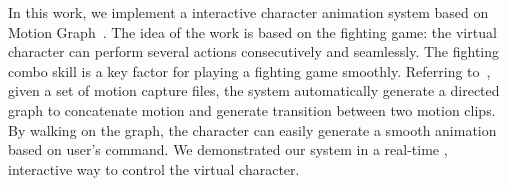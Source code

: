 In this work, we implement a interactive character animation system based on Motion Graph~\cite{kovar2002}.
The idea of the work is based on the fighting game: the virtual character can perform several actions 
consecutively and seamlessly. 
The fighting combo skill is a key factor for playing a fighting game smoothly.
Referring to~\cite{kovar2002}, given a set of motion capture files, the system automatically 
generate a directed graph to concatenate motion and generate transition between 
two motion clips.
By walking on the graph, the character can easily generate a smooth animation 
based on user's command.
We demonstrated our system in a real-time , interactive way to control the 
virtual character. 